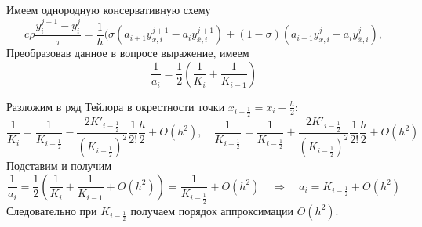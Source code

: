 \documentclass[12pt, a4paper]{article}
\begin{document}
	\begin{comment}
		Имем однородную консервативную схему 
		\begin{equation*}
			c \rho \frac{y^{j+1}_i - y^{j}_i}{\tau} = \frac{1}{h} (\sigma(a_{i+1} y^{j+1}_{i+\frac{1}{2}} - a_{i} y^{j+1}_{i-\frac{1}{2}}) + (1-\sigma)(a_{i+1} y^{j}_{i+\frac{1}{2}} - a_{i} y^{j}_{i-\frac{1}{2}})),
		\end{equation*}
		где $a_i = \displaystyle{(\frac{1}{h}\int_{x_{i-1}}^{x_i} \frac{dx}{K(x)})^{-1}}$.
		
		 
		Пусть $a_i = \frac{2 K(x_i) K(x_{i-1})}{K(x_i) + K(x_{i-1})}$. Тогда из равенства $\frac{2 K(x_i) K(x_{i-1})}{K(x_i) + K(x_{i-1})} = \displaystyle{(\frac{1}{h}\int_{x_{i-1}}^{x_i} \frac{dx}{K(x)})^{-1}}$ получим, что
		\begin{equation*}
			\int_{x_{i-1}}^{x_i} \frac{dx}{K(x)} = h \frac{2 K(x_i) K(x_{i-1})}{K(x_i) + K(x_{i-1})} = \frac{h}{2} (\frac{1}{K(x_{i-1})} + \frac{1}{K(x_{i})}).
		\end{equation*}
		Можно увидеть, что выражение является формулой трапеций, которая, как известно, имеет второй порядок точности. Следовательно рассмотренный случай также имеет 2 порядок.
	\end{comment}
	
	Имеем однородную консервативную схему 
	\begin{equation*}
		c \rho \frac{y^{j+1}_i - y^{j}_i}{\tau} = \frac{1}{h} (\sigma(a_{i+1} y^{j+1}_{x,i} - a_{i} y^{j+1}_{\bar{x},i}) + (1-\sigma)(a_{i+1} y^{j}_{x,i} - a_{i} y^{j}_{\bar{x},i}),
	\end{equation*}
	Преобразовав данное в вопросе выражение, имеем
	\begin{equation*}
		\frac{1}{a_i} = \frac{1}{2} \left( \frac{1}{K_i} + \frac{1}{K_{i-1}} \right)
	\end{equation*}
	
	
	Разложим в ряд Тейлора в окрестности точки $x_{i-\frac{1}{2}} = x_i - \frac{h}{2}$:
	\begin{equation*}
		\frac{1}{K_i} = \frac{1}{K_{i-\frac{1}{2}}} - \frac{2 K'_{i-\frac{1}{2}}}{(K_{i-\frac{1}{2}})^2} \frac{1}{2!} \frac{h}{2} + O(h^2), \quad
		\frac{1}{K_{i-\frac{1}{2}}} = \frac{1}{K_{i-\frac{1}{2}}} + \frac{2 K'_{i-\frac{1}{2}}}{(K_{i-\frac{1}{2}})^2} \frac{1}{2!} \frac{h}{2} + O(h^2)
	\end{equation*}
	Подставим и получим
	\begin{equation*}
	\frac{1}{a_i} = \frac{1}{2} \left( \frac{1}{K_i} + \frac{1}{K_{i-1} } + O(h^2)\right) = \frac{1}{K_{i-\frac{1}{2}}} + O(h^2)  \quad \Rightarrow \quad a_i = K_{i-\frac{1}{2}} + O(h^2)
	\end{equation*}
	Следовательно при $K_{i-\frac{1}{2}}$ получаем порядок аппроксимации $O(h^2)$.
	
\end{document}
